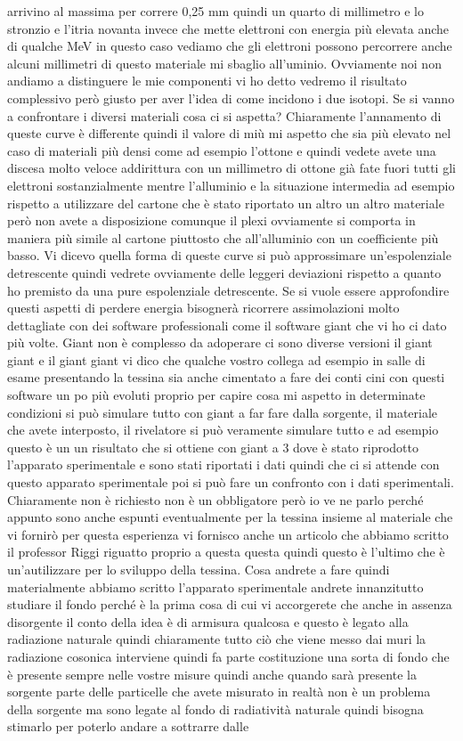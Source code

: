{arrivino al massima per correre 0,25 mm quindi un quarto di millimetro e lo stronzio e l'itria novanta invece che mette elettroni con energia più elevata anche di qualche MeV in questo caso vediamo che gli elettroni possono percorrere anche alcuni millimetri di questo materiale mi sbaglio all'uminio. Ovviamente noi non andiamo a distinguere le mie componenti vi ho detto vedremo il risultato complessivo però giusto per aver l'idea di come incidono i due isotopi. Se si vanno a confrontare i diversi materiali cosa ci si aspetta? Chiaramente l'annamento di queste curve è differente quindi il valore di miù mi aspetto che sia più elevato nel caso di materiali più densi come ad esempio l'ottone e quindi vedete avete una discesa molto veloce addirittura con un millimetro di ottone già fate fuori tutti gli elettroni sostanzialmente mentre l'alluminio e la situazione intermedia ad esempio rispetto a utilizzare del cartone che è stato riportato un altro un altro materiale però non avete a disposizione comunque il plexi ovviamente si comporta in maniera più simile al cartone piuttosto che all'alluminio con un coefficiente più basso. Vi dicevo quella forma di queste curve si può approssimare un'espolenziale detrescente quindi vedrete ovviamente delle leggeri deviazioni rispetto a quanto ho premisto da una pure espolenziale detrescente. Se si vuole essere approfondire questi aspetti di perdere energia bisognerà ricorrere assimolazioni molto dettagliate con dei software professionali come il software giant che vi ho ci dato più volte. Giant non è complesso da adoperare ci sono diverse versioni il giant giant e il giant giant vi dico che qualche vostro collega ad esempio in salle di esame presentando la tessina sia anche cimentato a fare dei conti cini con questi software un po più evoluti proprio per capire cosa mi aspetto in determinate condizioni si può simulare tutto con giant a far fare dalla sorgente, il materiale che avete interposto, il rivelatore si può veramente simulare tutto e ad esempio questo è un un risultato che si ottiene con giant a 3 dove è stato riprodotto l'apparato sperimentale e sono stati riportati i dati quindi che ci si attende con questo apparato sperimentale poi si può fare un confronto con i dati sperimentali. Chiaramente non è richiesto non è un obbligatore però io ve ne parlo perché appunto sono anche espunti eventualmente per la tessina insieme al materiale che vi fornirò per questa esperienza vi fornisco anche un articolo che abbiamo scritto il professor Riggi riguatto proprio a questa questa quindi questo è l'ultimo che è un'autilizzare per lo sviluppo della tessina. Cosa andrete a fare quindi materialmente abbiamo scritto l'apparato sperimentale andrete innanzitutto studiare il fondo perché è la prima cosa di cui vi accorgerete che anche in assenza disorgente il conto della idea è di armisura qualcosa e questo è legato alla radiazione naturale quindi chiaramente tutto ciò che viene messo dai muri la radiazione cosonica interviene quindi fa parte costituzione una sorta di fondo che è presente sempre nelle vostre misure quindi anche quando sarà presente la sorgente parte delle particelle che avete misurato in realtà non è un problema della sorgente ma sono legate al fondo di radiatività naturale quindi bisogna stimarlo per poterlo andare a sottrarre dalle }
